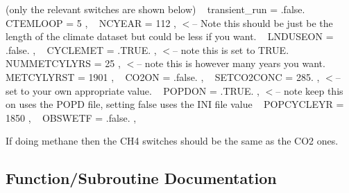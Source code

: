 (only the relevant switches are shown below) ~\newline
 transient\+\_\+run = .false. ~\newline
 C\+T\+E\+M\+L\+O\+O\+P = 5 , ~\newline
 N\+C\+Y\+E\+A\+R = 112 , $<$-- Note this should be just be the length of the climate dataset but could be less if you want. ~\newline
 L\+N\+D\+U\+S\+E\+O\+N = .false. , ~\newline
 C\+Y\+C\+L\+E\+M\+E\+T = .T\+R\+U\+E. , $<$-- note this is set to T\+R\+U\+E. ~\newline
 N\+U\+M\+M\+E\+T\+C\+Y\+L\+Y\+R\+S = 25 , $<$-- note this is however many years you want. ~\newline
 M\+E\+T\+C\+Y\+L\+Y\+R\+S\+T = 1901 , ~\newline
 C\+O2\+O\+N = .false. , ~\newline
 S\+E\+T\+C\+O2\+C\+O\+N\+C = 285. , $<$-- set to your own appropriate value. ~\newline
 P\+O\+P\+D\+O\+N = .T\+R\+U\+E. , $<$-- note keep this on uses the P\+O\+P\+D file, setting false uses the I\+N\+I file value ~\newline
 P\+O\+P\+C\+Y\+C\+L\+E\+Y\+R = 1850 , ~\newline
 O\+B\+S\+W\+E\+T\+F = .false. ,

If doing methane then the C\+H4 switches should be the same as the C\+O2 ones. 

\subsection{Function/\+Subroutine Documentation}
\hypertarget{read__from__job__options_8f90_a59635532072b59aa5db6bd717cebb79b}{}
